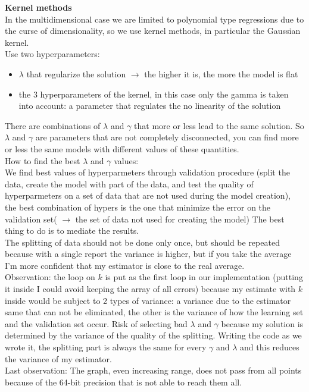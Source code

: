 \textbf {Kernel methods}\\

In the multidimensional case we are limited to polynomial type regressions due to the curse of dimensionality, so we use kernel methods, in particular the Gaussian kernel.\\
Use two hyperparameters:
\begin{itemize}
	\item $\lambda$ that regularize the solution $\rightarrow$ the higher it is, the more the model is flat
	\item the 3 hyperparameters of the kernel, in this case only the gamma is taken into account: a parameter that regulates the no linearity of the solution
\end{itemize}
There are combinations of $\lambda$ and $\gamma$ that more or less lead to the same solution. So $\lambda$ and $\gamma$ are parameters that are not completely disconnected, you can find more or less the same models with different values of these quantities.\\
How to find the best $\lambda$ and $\gamma$ values:\\
We find best values of hyperparmeters through validation procedure (split the data, create the model with part of the data, and test the quality of hyperparmeters on a set of data that are not used during the model creation), the best combination of hypers is the one that minimize the error on the validation set( $\rightarrow$ the set of data not used for creating the model)
The best thing to do is to mediate the results.\\
The splitting of data should not be done only once, but should be repeated because with a single report the variance is higher, but if you take the average I'm more confident that my estimator is close to the real average.\\
Observation: the loop on $k$ is put as the first loop in our implementation (putting it inside I could avoid keeping the array of all errors) because my estimate with $k$ inside would be subject to 2 types of variance: a variance due to the estimator same that can not be eliminated, the other is the variance of how the learning set and the validation set occur. Risk of selecting bad $\lambda$ and $\gamma$ because my solution is determined by the variance of the quality of the splitting. Writing the code as we wrote it, the splitting part is always the same for every $\gamma$ and $\lambda$ and this reduces the variance of my estimator.\\
Last observation: The graph, even increasing range, does not pass from all points because of the 64-bit precision that is not able to reach them all.

